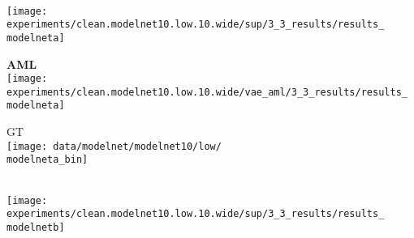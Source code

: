 {\footnotesize
\newcommand{\modelneta}{15318} %
\newcommand{\modelnetb}{2664}
\newcommand{\modelnetc}{9324} %
\newcommand{\modelnetd}{18648} %
\newcommand{\modelnete}{9990}
\newcommand{\modelnetf}{5994}
\newcommand{\modelnetg}{12654}
\newcommand{\modelneth}{11988}

\begin{minipage}[t]{0.02\textwidth}
    \vspace{0px}\centering
    \vspace{12mm}
\end{minipage}
\begin{minipage}[t]{0.97\textwidth}
    \vspace{0px}\centering
    \begin{minipage}[t]{0.145\textwidth}
        \vspace{0px}\centering
        \cite{Dai2017CVPRa}\\[-1px]
        \texttt{[image: experiments/clean.modelnet10.low.10.wide/sup/3\_3\_results/results\_\\modelneta]}
    \end{minipage}
    \begin{minipage}[t]{0.145\textwidth}
        \vspace{0px}\centering
        {\bf\color{MPIIorange} AML}\\[-1px]
        \texttt{[image: experiments/clean.modelnet10.low.10.wide/vae\_aml/3\_3\_results/results\_\\modelneta]}
    \end{minipage}
    \begin{minipage}[t]{0.145\textwidth}
        \vspace{0px}\centering
        GT\\[-1px]
        \texttt{[image: data/modelnet/modelnet10/low/\\modelneta\_bin]}
    \end{minipage}
    \hspace*{2.5mm}
    \begin{minipage}[t]{0.145\textwidth}
        \vspace{0px}\centering
        \cite{Dai2017CVPRa}\\[-1px]
        \texttt{[image: experiments/clean.modelnet10.low.10.wide/sup/3\_3\_results/results\_\\modelnetb]}
    \end{minipage}

\end{minipage}}

